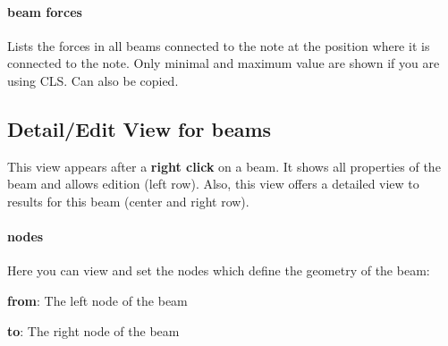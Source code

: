 \documentclass[a4paper,11pt]{report}
\begin{document}
\paragraph{beam forces}
Lists the forces in all beams connected to the note at the position where it is connected to the note. Only minimal and maximum value are shown if you are using CLS. Can also be copied.

\subsection{Detail/Edit View for beams}
\label{sec:beamdetail}



\begin{figure}[H]
\end{figure}

This view appears after a \textbf{right click} on a beam. It shows all properties of the beam and allows edition (left row). Also, this view offers a detailed view to results for this beam (center and right row).

\paragraph{nodes}
Here you can view and set the nodes which define the geometry of the beam:
\begin{trivlist}
	\leftskip=1cm
	\item[]\textbf{from}: The left node of the beam
	\item[]\textbf{to}: The right node of the beam
\end{trivlist}
\end{document}
